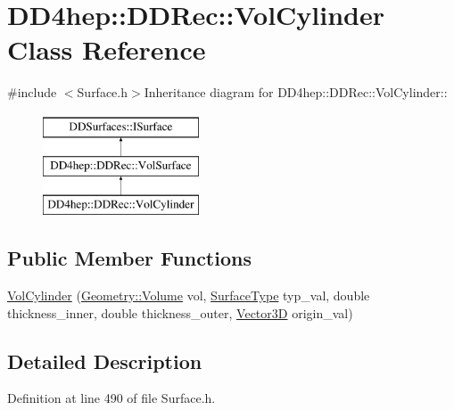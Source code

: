 \hypertarget{class_d_d4hep_1_1_d_d_rec_1_1_vol_cylinder}{
\section{DD4hep::DDRec::VolCylinder Class Reference}
\label{class_d_d4hep_1_1_d_d_rec_1_1_vol_cylinder}
}


{\ttfamily \#include $<$Surface.h$>$}Inheritance diagram for DD4hep::DDRec::VolCylinder::\begin{figure}[H]
\begin{center}
\leavevmode
\includegraphics[height=3cm]{class_d_d4hep_1_1_d_d_rec_1_1_vol_cylinder}
\end{center}
\end{figure}
\subsection*{Public Member Functions}
\begin{DoxyCompactItemize}
\item 
\hyperlink{class_d_d4hep_1_1_d_d_rec_1_1_vol_cylinder_ae559c0cb9b5a969ba0f14db3d419d376}{VolCylinder} (\hyperlink{class_d_d4hep_1_1_geometry_1_1_volume}{Geometry::Volume} vol, \hyperlink{class_d_d_surfaces_1_1_surface_type}{SurfaceType} typ\_\-val, double thickness\_\-inner, double thickness\_\-outer, \hyperlink{class_d_d_surfaces_1_1_vector3_d}{Vector3D} origin\_\-val)
\end{DoxyCompactItemize}


\subsection{Detailed Description}


Definition at line 490 of file Surface.h.


